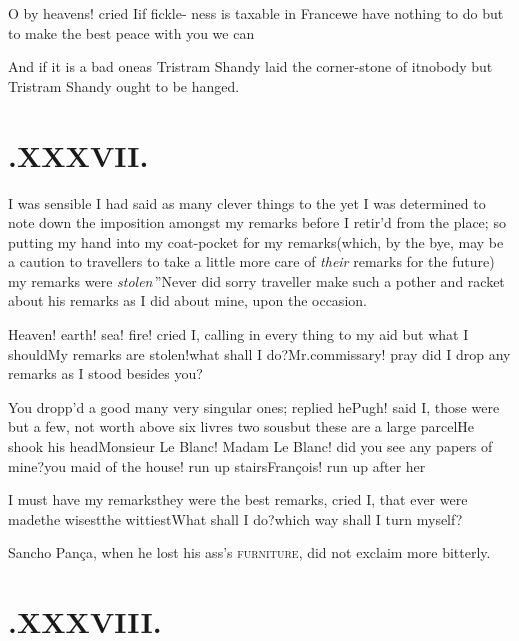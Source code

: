 \documentclass{article}
\begin{document}
\tsh O by heavens! cried I\tsk if
fickle-\break
ness is taxable in France\tsk we have no\-thing to do
but to make the best peace with you we can\tsh\\[4pt]

\tsh And if it is a bad one\tsk as Tris\-tram
Shandy laid the corner-stone of it\tsk nobody but Tristram
Shandy ought to be hanged.

\section{.\enspace XXXVII.}

 I was sensible I had said as
many clever things to the
\break 
yet I was determined to note down the imposition amongst my
remarks before I
retir’d from the place; so putting my hand into my
coat-pocket for my remarks\tsk (which, by the bye, may be a
caution to travellers to take a little more care of \textit{their}
remarks for the future) \lqq my\break
\lqq remarks were \textit{stolen}\,”\tsh Never did\break
sorry traveller make
such a pother and racket about his remarks as I did about mine,
upon the occasion.

Heaven! earth! sea! fire! cried I, calling in every thing to my
aid but what I should\tsh My remarks are
stolen!\tsk what shall I do?\tsh Mr.\@ commissary! pray
did I drop any remarks as I stood besides you?\tsh

You dropp’d a good many very singular ones; replied
he\tsh Pugh! said I, those were but a few, not worth above
six livres two sous\tsk but these are a large
parcel\tsh He shook his head\tsh Monsieur Le
Blanc! Madam Le Blanc! did you see any papers of
mine?\tsk you maid of the house! run up
stairs\tsk François! run up after
her\tsh

\tsh I must have my remarks\tsh they were the best
remarks, cried I, that ever were made\tsk the wisest\tsk the
wittiest\tsk What shall I do?\tsk which way shall I turn
myself?

Sancho Pança, when he lost his ass’s
\textsc{furniture}, did not exclaim more bitterly.

\section{.\enspace XXXVIII.}
\end{document}
